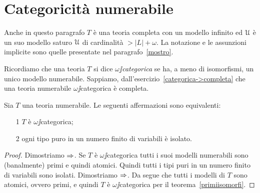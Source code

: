 \section{Categoricit\`a numerabile}

Anche in questo paragrafo $T$ \`e una teoria completa con un modello infinito ed $\EuScript U$ \`e un suo modello saturo $\EuScript U$ di cardinalit\`a $>|L|+\omega$. La notazione e le assunzioni implicite sono quelle presentate nel paragrafo~\ref{mostro}.

Ricordiamo che una teoria $T$ si dice \emph{$\omega\jj$categorica\/} se ha, a meno di isomorfismi, un unico modello numerabile. Sappiamo, dall'esercizio~\ref{categorica->completa} che una teoria numerabile $\omega\jj$categorica \`e completa.

\begin{theorem} Sia $T$ una teoria numerabile. Le seguenti affermazioni sono equivalenti:
\begin{itemize}
\item[1] $T$ \`e $\omega\jj$categorica;
\item[2] ogni tipo puro in un numero finito di variabili \`e isolato.
\end{itemize}
\end{theorem}

\begin{proof} 
Dimostriamo $\Rightarrow$. Se $T$ \`e $\omega\jj$categorica  tutti i suoi modelli numerabili sono (banalmente) primi e quindi atomici. Quindi tutti i tipi puri in un numero finito di variabili sono isolati. Dimostriamo $\Rightarrow$. Da  segue che tutti i modelli di $T$ sono atomici, ovvero primi, e quindi $T$ \`e $\omega\jj$categorica per il teorema~\ref{primiisomorfi}.
\end{proof}

